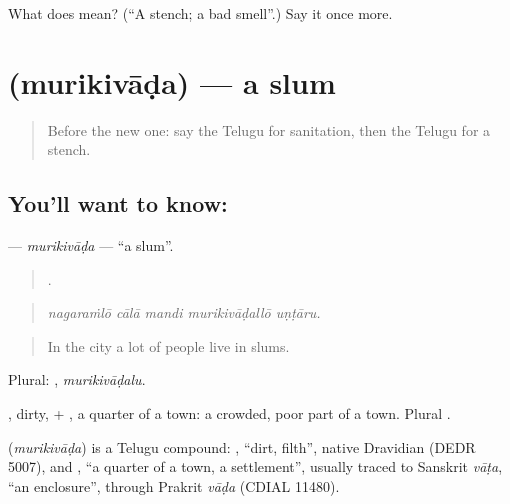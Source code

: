 \begin{tcolorbox}[breakable,colback=teal!4,colframe=teal!35!black,title={Before you move on}]
What does  mean? (\textquotedblleft{}A stench; a bad smell\textquotedblright{}.) Say it once more.
\end{tcolorbox}
\section[\texorpdfstring{\te{మురికివాడ} (murikivāḍa)}{మురికివాడ (murikivāḍa)}]{ (murikivāḍa) — a slum}

\label{lesson:TE-C468-murikivada}



\begin{quote}
Before the new one: say the Telugu for sanitation, then the Telugu for a stench.
\end{quote}

\subsection*{You'll want to know: }
\textbf{} — \emph{murikivāḍa} — \textquotedblleft{}a slum\textquotedblright{}.

\begin{quote}
    .
\end{quote}

\begin{quote}
\emph{nagaraṁlō cālā mandi murikivāḍallō uṇṭāru.}
\end{quote}

\begin{quote}
In the city a lot of people live in slums.
\end{quote}

Plural: , \emph{murikivāḍalu}.

, dirty, + , a quarter of a town: a crowded, poor part of a town. Plural .

\begin{cousinweb}
\textbf{} (\emph{murikivāḍa}) is a Telugu compound: , \textquotedblleft{}dirt, filth\textquotedblright{}, native Dravidian (DEDR 5007), and , \textquotedblleft{}a quarter of a town, a settlement\textquotedblright{}, usually traced to Sanskrit \emph{vāṭa}, \textquotedblleft{}an enclosure\textquotedblright{}, through Prakrit \emph{vāḍa} (CDIAL 11480).
\end{cousinweb}

